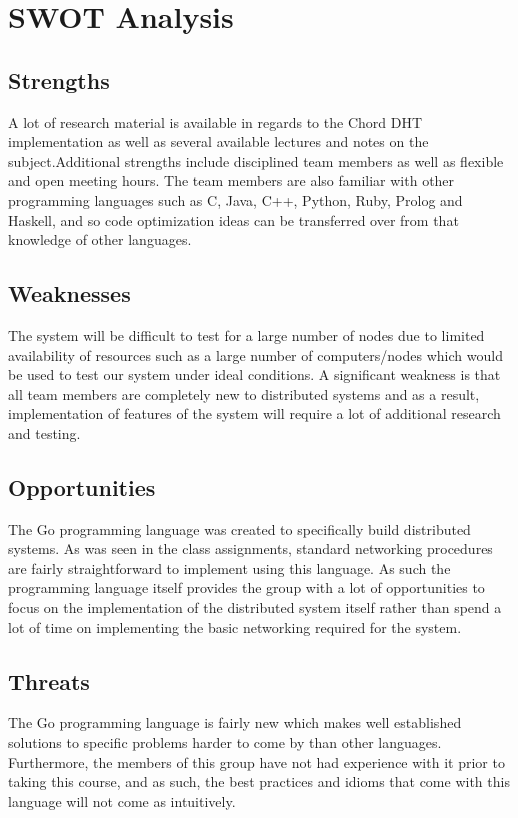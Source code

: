 \documentclass[fleqn,24pt]{SelfArx} %
\begin{document}
\section{SWOT Analysis}

\subsection{Strengths}
A lot of research material is available in regards to the Chord DHT implementation as well as several available lectures and notes on the subject.Additional strengths include disciplined team members as well as flexible and open meeting hours. The team members are also familiar with other programming languages such as C, Java, C++, Python, Ruby, Prolog and Haskell, and so code optimization ideas can be transferred over from that knowledge of other languages.

\subsection{Weaknesses}
The system will be difficult to test for a large number of nodes due to limited availability of resources such as a large number of computers/nodes which would be used to test our system under ideal conditions. A significant weakness is that all team members are completely new to distributed systems and as a result, implementation of features of the system will require a lot of additional research and testing.

\subsection{Opportunities}
The Go programming language was created to specifically build distributed systems. As was seen in the class assignments, standard networking procedures are fairly straightforward to implement using this language. As such the programming language itself provides the group with a lot of opportunities to focus on the implementation of the distributed system itself rather than spend a lot of time on implementing the basic networking required for the system.

\subsection{Threats}
The Go programming language is fairly new which makes well established solutions to specific problems harder to come by than other languages. Furthermore, the members of this group have not had experience with it prior to taking this course, and as such, the best practices and idioms that come with this language will not come as intuitively. 
\end{document}
